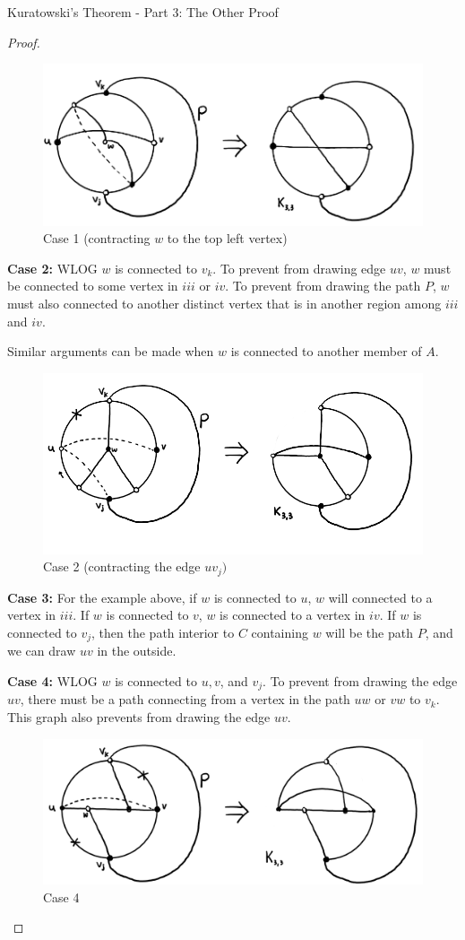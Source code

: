 \documentclass[12pt]{article}
\theoremstyle{definition}
\begin{document}
\begin{section}{Kuratowski's Theorem - Part 3: The Other Proof}
\begin{proof}
\begin{figure}[hbt!]
    \centering
    \includegraphics[width=0.7\linewidth]{graphs/case_1.png}
    \caption{Case 1 (contracting $w$ to the top left vertex)}
\end{figure}

\textbf{Case 2:} WLOG $w$ is connected to $v_k$. To prevent from drawing edge $uv$, $w$ must be connected to some vertex in $iii$ or $iv$. To prevent from drawing the path $P$, $w$ must also connected to another distinct vertex that is in another region among $iii$ and $iv$.

Similar arguments can be made when $w$ is connected to another member of $A$.

\begin{figure}[hbt!]
    \centering
    \includegraphics[width=0.7\linewidth]{graphs/case_2.png}
    \caption{Case 2 (contracting the edge $uv_j)$}
\end{figure}

\textbf{Case 3:} For the example above, if $w$ is connected to $u$, $w$ will connected to a vertex in $iii$. If $w$ is connected to $v$, $w$ is connected to a vertex in $iv$. If $w$ is connected to $v_j$, then the path interior to $C$ containing $w$ will be the path $P$, and we can draw $uv$ in the outside.

\textbf{Case 4:} WLOG $w$ is connected to $u, v$, and $v_j$. To prevent from drawing the edge $uv$, there must be a path connecting from a vertex in the path $uw$ or $vw$ to $v_k$. This graph also prevents from drawing the edge $uv$.

\begin{figure}[hbt!]
    \centering
    \includegraphics[width=0.5\linewidth]{graphs/case_4.png}
    \caption{Case 4}
\end{figure}


\end{proof}
\end{section}
\end{document}
